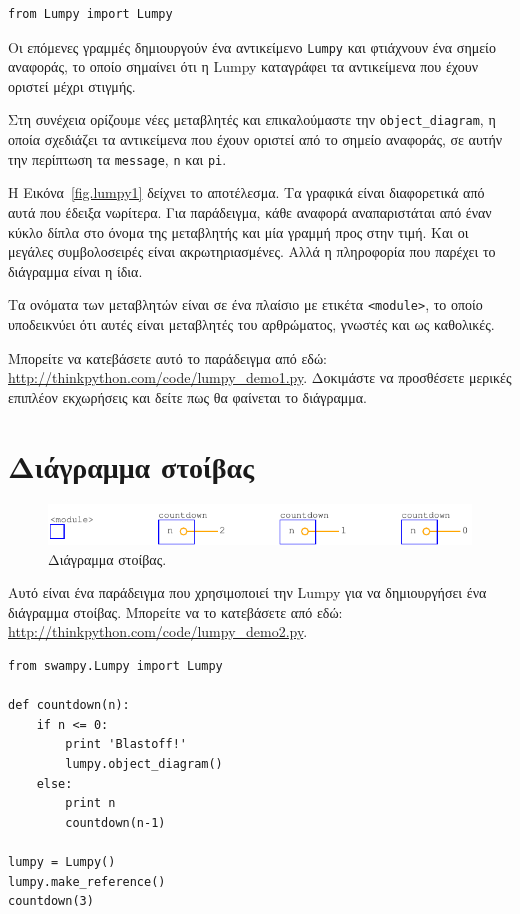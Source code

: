\documentclass[10pt]{book}
\begin{document}
\begin{verbatim}
from Lumpy import Lumpy
\end{verbatim}

Οι επόμενες γραμμές δημιουργούν ένα αντικείμενο {\tt Lumpy} και φτιάχνουν ένα σημείο αναφοράς, το οποίο
σημαίνει ότι η Lumpy καταγράφει τα αντικείμενα που έχουν οριστεί μέχρι στιγμής.

Στη συνέχεια ορίζουμε νέες μεταβλητές και επικαλούμαστε την \verb"object_diagram", η οποία σχεδιάζει
τα αντικείμενα που έχουν οριστεί από το σημείο αναφοράς, σε αυτήν την περίπτωση τα {\tt message}, {\tt n}
και {\tt pi}.

Η Εικόνα~\ref{fig.lumpy1} δείχνει το αποτέλεσμα. Τα γραφικά είναι διαφορετικά από αυτά που έδειξα νωρίτερα.
Για παράδειγμα, κάθε αναφορά αναπαριστάται από έναν κύκλο δίπλα στο όνομα της μεταβλητής και μία γραμμή προς
στην τιμή.  Και οι μεγάλες συμβολοσειρές είναι ακρωτηριασμένες.  Αλλά η πληροφορία που παρέχει το διάγραμμα
είναι η ίδια.

Τα ονόματα των μεταβλητών είναι σε ένα πλαίσιο με ετικέτα \verb"<module>", το οποίο υποδεικνύει ότι αυτές
είναι μεταβλητές του αρθρώματος, γνωστές και ως καθολικές.

Μπορείτε να κατεβάσετε αυτό το παράδειγμα από εδώ: \url{http://thinkpython.com/code/lumpy_demo1.py}.
Δοκιμάστε να προσθέσετε μερικές επιπλέον εκχωρήσεις και δείτε πως θα φαίνεται το διάγραμμα.



\section{Διάγραμμα στοίβας}

\begin{figure}
\centerline
{\includegraphics[scale=0.7]{figs/lumpydemo2.pdf}}
\caption{Διάγραμμα στοίβας.}
\label{fig.lumpy2}
\end{figure}

Αυτό είναι ένα παράδειγμα που χρησιμοποιεί την Lumpy για να δημιουργήσει ένα διάγραμμα στοίβας.
Μπορείτε να το κατεβάσετε από εδώ: \url{http://thinkpython.com/code/lumpy_demo2.py}.
 

\begin{verbatim}
from swampy.Lumpy import Lumpy

def countdown(n):
    if n <= 0:
        print 'Blastoff!'
        lumpy.object_diagram()
    else:
        print n
        countdown(n-1)

lumpy = Lumpy()
lumpy.make_reference()
countdown(3)
\end{verbatim}
\end{document}
